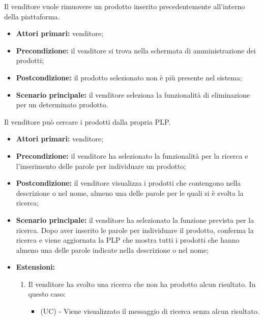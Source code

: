 Il venditore vuole rimuovere un prodotto inserito precedentemente all'interno della piattaforma.
\begin{itemize}
	\item \textbf{Attori primari:} venditore;
	\item \textbf{Precondizione:} il venditore si trova nella schermata di amministrazione dei prodotti;
	\item \textbf{Postcondizione:} il prodotto selezionato non è più presente nel sistema;
	\item \textbf{Scenario principale:} il venditore seleziona la funzionalità di eliminazione per un determinato prodotto.
\end{itemize}

Il venditore può cercare i prodotti dalla propria PLP.
\begin{itemize}
	\item \textbf{Attori primari:} venditore;
	\item \textbf{Precondizione:} il venditore ha selezionato la funzionalità per la ricerca e l'inserimento delle parole per individuare un prodotto;
	\item \textbf{Postcondizione:} il venditore visualizza i prodotti che contengono nella descrizione o nel nome, almeno una delle parole per le quali si è svolta la ricerca;
	\item \textbf{Scenario principale:} il venditore ha selezionato la funzione prevista per la ricerca. Dopo aver inserito le parole per individuare il prodotto, conferma la ricerca e viene aggiornata la PLP che mostra tutti i prodotti che hanno almeno una delle parole indicate nella descrizione o nel nome;
	\item \textbf{Estensioni:}
	\begin{enumerate}[label=\lett]
		\item Il venditore ha svolto una ricerca che non ha prodotto alcun risultato. In questo caso:
		\begin{itemize}
			\item (UC) - Viene visualizzato il messaggio di ricerca senza alcun risultato.
		\end{itemize}
	\end{enumerate}
\end{itemize}



